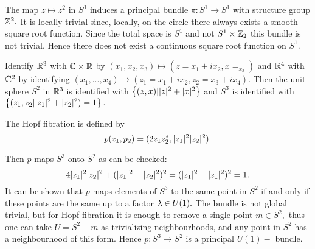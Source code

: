 \begin{exmp}
 \label{JB:2.3b}
The map $z \mapsto z^{2}$ in $S^{1}$ induces a principal bundle $\pi : S^{1} \to S^{1}$ with structure group $\mathbb Z^{2}.$
It is locally trivial since, locally, on the circle there always exists a smooth square root function. Since the total
space is $S^{1}$ and not $S^{1}\times \mathbb Z_{2}$ this bundle is not trivial. Hence there does not exist a continuous
square root function on $S^{1}.$
\end{exmp}


\begin{exmp}
 \label{JB:2.3a}
Identify $\mathbb R^{3}$ with $\mathbb C \times \mathbb R$ by $(x_{1}, x_{2}, x_{3}) \mapsto (z=x_{1} + ix_{2}, x=_{x_{3}})$ and $\mathbb R^{4}$
with $\mathbb C^{2}$ by identifying $(x_{1},...,x_{4}) \mapsto (z_{1}=x_{1}+ix_{2}, z_{2}=x_{3}+ix_{4}).$ Then the unit sphere
$S^{2}$ in $\mathbb R^{3}$ is identified with $\left\{ (z,x)| \lvert z \rvert^{2}+\lvert x \rvert^{2} \right\}$ and $S^{3}$ is identified with
$\left\{ (z_{1}, z_{2}| \lvert z_{1} \rvert^{2}+\lvert z_{2} \rvert^{2})=1 \right\}.$

The Hopf fibration is defined by
$$
p(z_{1}, p_{2})=(2z_{1}z_{2}^{*}, \lvert z_{1} \rvert^{2}\lvert z_{2} \rvert^{2}).
$$

Then $p$ maps $S^{3}$ onto $S^{2}$ as can be checked: $$4\lvert z_{1} \rvert^{2}\lvert z_{2} \rvert^{2}+
(\lvert z_{1} \rvert^{2}-\lvert z_{2} \rvert^{2})^{2}=(\lvert z_{1} \rvert^{2}+\lvert z_{1} \rvert^{2})^{2}=1.
$$ It can be shown that $p$ maps elements of $S^{3}$ to the same point in $S^{2}$ if and only if these points are the
same up to a factor $\lambda \in U(1).$ The bundle is not global trivial, but for Hopf fibration it is enough to remove a
single point $m \in S^{2},$ thus one can take $U=S^{2}-{m}$ as trivializing neighbourhoods, and any point in $S^{2}$
has a neighbourhood of this form. Hence $p: S^{3} \to S^{2}$ is a principal $U(1)-$ bundle.
\end{exmp}

